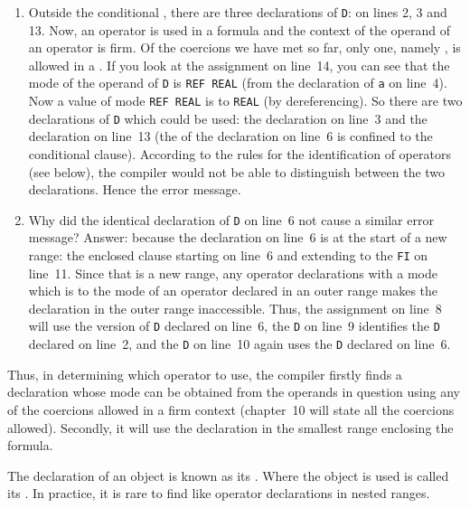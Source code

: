 \begin{enumerate}
\item Outside the conditional ,
there are three declarations of \verb|D|: on lines 2, 3 and 13. Now,
an operator is used in a formula and the context of the operand of an
operator is firm. Of the coercions we have met so far, only one,
namely , is allowed in
a .  If you look at the assignment
on line~14, you can see that the mode of the operand of \verb|D| is
\verb|REF REAL| (from the declaration of \verb|a| on line~4).  Now a
value of mode \verb|REF REAL| is  to \verb|REAL|
(by dereferencing).  So there are two declarations of \verb|D| which
could be used: the declaration on line~3 and the declaration on
line~13 (the  of the declaration on line~6 is confined to
the conditional clause).  According to the rules for the
identification of operators (see below), the compiler would not be
able to distinguish between the two declarations.  Hence the error
message.
\item Why did the identical declaration of \verb|D| on line~6 not
cause a similar error message? Answer: because the declaration on
line~6 is at the start of a new range: the enclosed clause starting
on line~6 and extending to the \verb|FI| on line~11.  Since that is a
new range, any operator declarations with a mode which is
 to the mode of an operator declared in an outer
range makes the declaration in the outer range inaccessible. Thus,
the assignment on line~8 will use the version of \verb|D| declared on
line~6, the \verb|D| on line~9 identifies the \verb|D| declared on
line~2, and the \verb|D| on line~10 again uses the \verb|D| declared
on line~6.
\end{enumerate}

Thus, in determining which operator to use, the compiler firstly
finds a declaration whose mode can be obtained from the operands in
question using any of the coercions allowed in a firm context
(chapter~10 will state all the coercions allowed). Secondly, it will
use the declaration in the smallest range enclosing the formula.

The declaration of an object is known as its
. Where the
object is used is called its
.  In
practice, it is rare to find like operator declarations in nested
ranges.

